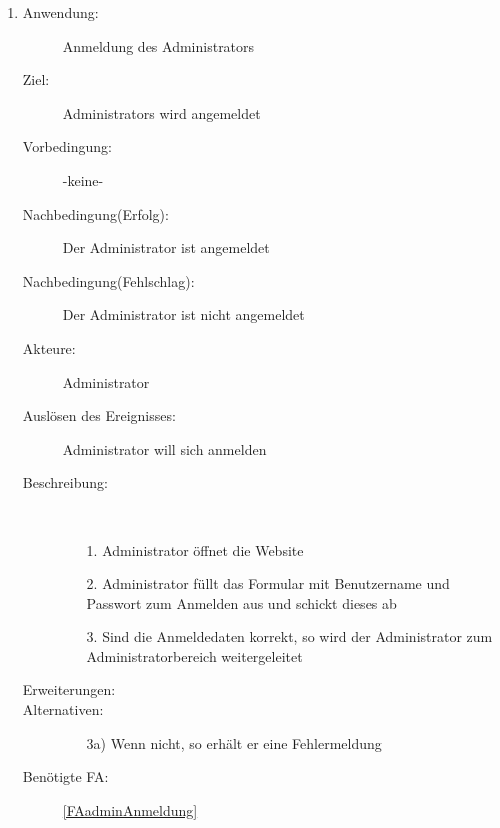 \documentclass[parskip=full]{scrartcl}
\newcommand{\swtLabel}[1]{\textbf{/#1\arabic*0/}}
\begin{document}
\begin{enumerate} [label=\swtLabel{A}]
	\item \label{UCadminAnmeldung}
    \begin{description}
    \item[Anwendung:] Anmeldung des Administrators
    \item[Ziel:] Administrators wird angemeldet
  	\item[Vorbedingung:] -keine-
  	\item[Nachbedingung(Erfolg):] Der Administrator ist angemeldet
  	\item[Nachbedingung(Fehlschlag):] Der Administrator ist nicht angemeldet
  	\item[Akteure:] Administrator
  	\item[Auslösen des Ereignisses:] Administrator will sich anmelden
  	\item[Beschreibung:]~
  	\begin{enumerate}
  	  \item[1.] Administrator öffnet die Website
  	  \item[2.] Administrator füllt das Formular mit Benutzername und Passwort zum Anmelden aus und schickt
  	  dieses ab %
  	  \item[3.] Sind die Anmeldedaten korrekt, so wird der Administrator zum
  	  Administratorbereich weitergeleitet
  	\end{enumerate}
  	\item[Erweiterungen:]  	
  	\item[Alternativen:]
	\begin{enumerate}
  	  \item[3a)] Wenn nicht, so erhält er eine Fehlermeldung
  	\end{enumerate}
  	\item[Benötigte FA:] \ref{FAadminAnmeldung}
  \end{description}
	

\end{enumerate}
\end{document}
